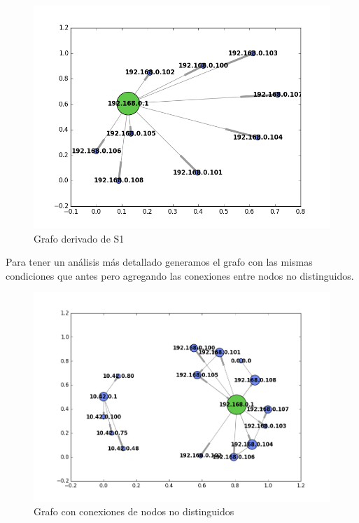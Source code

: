 \begin{figure}[H]
	\centering
	\includegraphics[width=0.8\linewidth]{imagenes/grafo-red-luis.png}
	\caption{Grafo derivado de S1 }
	\label{fig:eth-red-domestica}
\end{figure}

Para tener un análisis más detallado generamos el grafo con las mismas condiciones que antes pero agregando las conexiones entre nodos no distinguidos.

\begin{figure}[H]
	\centering
	\includegraphics[width=0.8\linewidth]{imagenes/grafo-full-redLuis}
	\caption{Grafo con conexiones de nodos no distinguidos}
	\label{fig:grafo-full-redLuis}
\end{figure}

